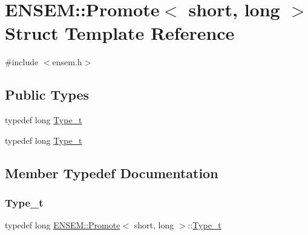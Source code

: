 \hypertarget{structENSEM_1_1Promote_3_01short_00_01long_01_4}{}\section{E\+N\+S\+EM\+:\+:Promote$<$ short, long $>$ Struct Template Reference}
\label{structENSEM_1_1Promote_3_01short_00_01long_01_4}


{\ttfamily \#include $<$ensem.\+h$>$}

\subsection*{Public Types}
\begin{DoxyCompactItemize}
\item 
typedef long \mbox{\hyperlink{structENSEM_1_1Promote_3_01short_00_01long_01_4_a560571e93323f728261d16b19c7d0df7}{Type\+\_\+t}}
\item 
typedef long \mbox{\hyperlink{structENSEM_1_1Promote_3_01short_00_01long_01_4_a560571e93323f728261d16b19c7d0df7}{Type\+\_\+t}}
\end{DoxyCompactItemize}


\subsection{Member Typedef Documentation}
\mbox{\label{structENSEM_1_1Promote_3_01short_00_01long_01_4_a560571e93323f728261d16b19c7d0df7}} 
\subsubsection{\texorpdfstring{Type\_t}{Type\_t}\hspace{0.1cm}{\footnotesize\ttfamily [1/2]}}
{\footnotesize\ttfamily typedef long \mbox{\hyperlink{structENSEM_1_1Promote}{E\+N\+S\+E\+M\+::\+Promote}}$<$ short, long $>$\+::\mbox{\hyperlink{structENSEM_1_1Promote_3_01short_00_01long_01_4_a560571e93323f728261d16b19c7d0df7}{Type\+\_\+t}}}

\mbox{\label{structENSEM_1_1Promote_3_01short_00_01long_01_4_a560571e93323f728261d16b19c7d0df7}} 
